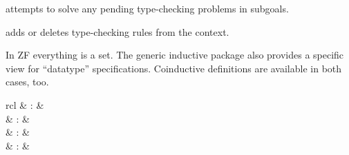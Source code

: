 \begin{isabellebody}
\begin{isamarkuptext}
\begin{description}
  \item \hyperlink{method.ZF.typecheck}{\mbox{}} attempts to solve any pending
  type-checking problems in subgoals.
  
  \item \hyperlink{attribute.ZF.TC}{\mbox{}} adds or deletes type-checking rules from
  the context.

  \end{description}%
\end{isamarkuptext}%
\isamarkuptrue%
%
\isamarkuptrue%
%
\isamarkuptrue%
%
\begin{isamarkuptext}%
In ZF everything is a set.  The generic inductive package also
  provides a specific view for ``datatype'' specifications.
  Coinductive definitions are available in both cases, too.

  \begin{matharray}{rcl}
    \hypertarget{command.ZF.inductive}{\hyperlink{command.ZF.inductive}{\mbox{}}} & : &  \\
    \hypertarget{command.ZF.coinductive}{\hyperlink{command.ZF.coinductive}{\mbox{}}} & : &  \\
    \hypertarget{command.ZF.datatype}{\hyperlink{command.ZF.datatype}{\mbox{}}} & : &  \\
    \hypertarget{command.ZF.codatatype}{\hyperlink{command.ZF.codatatype}{\mbox{}}} & : &  \\
  \end{matharray}


\end{isamarkuptext}
\end{isabellebody}
